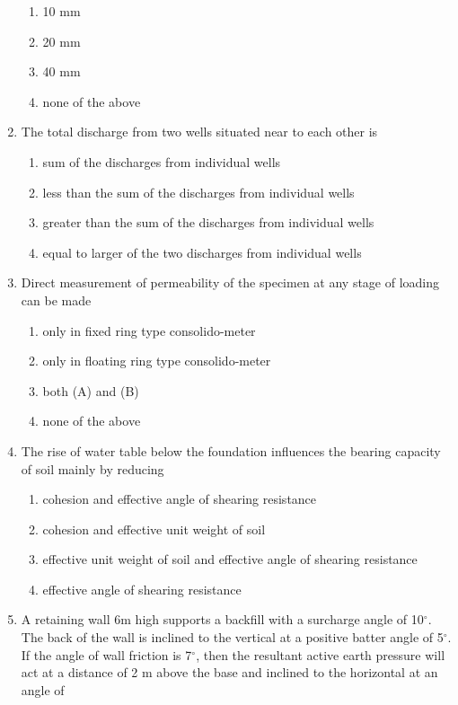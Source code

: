 \documentclass[11pt,a4paper]{article}
\begin{document}
\begin{enumerate}
\begin{enumerate}[label=\Alph*.]
\item{10 mm}
\item{20 mm}
\item{40 mm}
\item{none of the above}
\end{enumerate}
\item{The total discharge from two wells situated near to each other is}
\begin{enumerate}[label=\Alph*.]
\item{sum of the discharges from individual wells}
\item{less than the sum of the discharges from individual wells}
\item{greater than the sum of the discharges from individual wells}
\item{equal to larger of the two discharges from individual wells}
\end{enumerate}
\item{Direct measurement of permeability of the specimen at any stage of loading can be made}
\begin{enumerate}[label=\Alph*.]
\item{only in fixed ring type consolido-meter}
\item{only in floating ring type consolido-meter}
\item{both (A) and (B)}
\item{none of the above}
\end{enumerate}
\item{The rise of water table below the foundation influences the bearing capacity of soil mainly by reducing}
\begin{enumerate}[label=\Alph*.]
\item{cohesion and effective angle of shearing resistance}
\item{cohesion and effective unit weight of soil}
\item{effective unit weight of soil and effective angle of shearing resistance}
\item{effective angle of shearing resistance}
\end{enumerate}
\item{A retaining wall 6m high supports a backfill with a surcharge angle of 10$^\circ$. The back of the wall is inclined to the vertical at a positive batter angle of 5$^\circ$. If the angle of wall friction is 7$^\circ$, then the resultant active earth pressure will act at a distance of 2 m above the base and inclined to the horizontal at an angle of
}
\end{enumerate}
\end{document}
